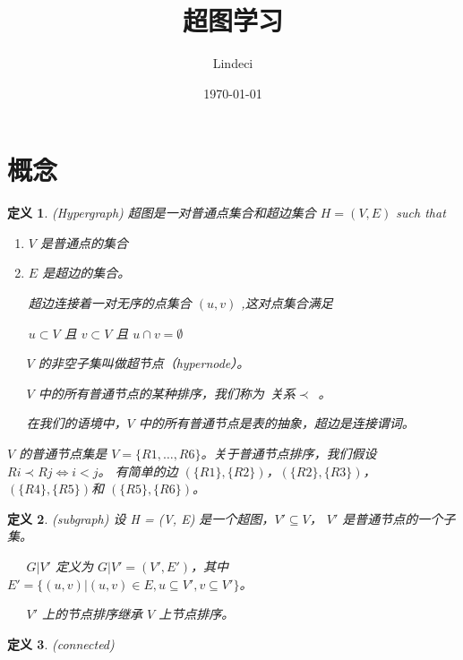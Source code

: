 \documentclass[fontset=none]{ctexart}
\title{超图学习}
\author{Lindeci}
\date{\today}
\begin{document}
\maketitle
\tableofcontents


\section{概念}

\newtheorem{definition}{定义}

\begin{definition}{(Hypergraph)}
    超图是一对普通点集合和超边集合 $H = (V,E)$ such that
    \begin{enumerate}
    \item $V$ 是普通点的集合
    \item $E$ 是超边的集合。
    
    超边连接着一对无序的点集合 $(u, v)$ ,这对点集合满足 
    
    $u \subset V$ 且 $v \subset V$ 且 $u \cap v = \emptyset$
    \end{enumerate}

    \ \ \ $V$ 的非空子集叫做超节点（hypernode）。

    \ \ \ $V$ 中的所有普通节点的某种排序，我们称为\ 关系$\prec$\ 。

    \ \ \ 在我们的语境中，$V$ 中的所有普通节点是表的抽象，超边是连接谓词。

    $V$ 的普通节点集是 $V = \{R1, \ldots , R6\}$。关于普通节点排序，我们假设 $Ri \prec Rj \Leftrightarrow i < j$。
    有简单的边 $(\{R1\},\{R2\})$，$(\{R2\},\{R3\})$，$(\{R4\},\{R5\})$和 $(\{R5\}, \{R6\})$。
\end{definition}

\begin{definition}{(subgraph)}
    设 H = (V, E) 是一个超图，$V' \subseteq V$， $V'$ 是普通节点的一个子集。

    \ \ \ $G|V'$ 定义为 $G|V' = (V',E')$，其中 $E' = \{(u,v)|(u,v) \in E,u \subseteq V',v \subseteq V'\}$。
    
    \ \ \ $V'$ 上的节点排序继承 $V$ 上节点排序。
\end{definition}

\begin{definition}{(connected)}
\end{definition}
\end{document}
